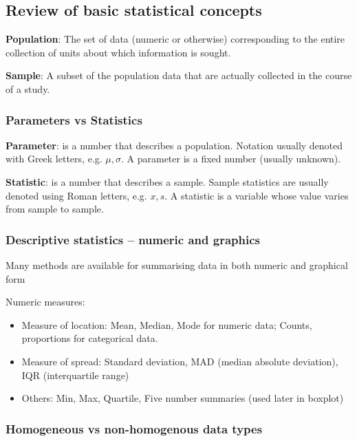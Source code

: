 \subsection{Review of basic statistical concepts}

\noindent\textbf{Population}: The set of data (numeric or otherwise) corresponding to the entire collection of units about which information is sought.

\noindent\textbf{Sample}: A subset of the population data that are actually collected in the course of a study.

\subsubsection{Parameters vs Statistics}

\noindent\textbf{Parameter}: is a number that describes a population. Notation usually denoted with Greek letters, e.g. $\mu,\sigma$. A parameter is a fixed number (usually unknown).

\noindent\textbf{Statistic}: is a number that describes a sample. Sample statistics are usually denoted using Roman letters, e.g. $x,s$. A statistic is a variable whose value varies from sample to sample.

\subsubsection{Descriptive statistics – numeric and graphics}

\indent

Many methods are available for summarising data in both numeric and graphical form

Numeric measures:

\begin{itemize}
    \item Measure of location: Mean, Median, Mode for numeric data; Counts, proportions for categorical data.
    \item Measure of spread: Standard deviation, MAD (median absolute deviation), IQR (interquartile range)
    \item Others: Min, Max, Quartile, Five number summaries (used later in boxplot)
\end{itemize}

\subsubsection{Homogeneous vs non-homogenous data types}


